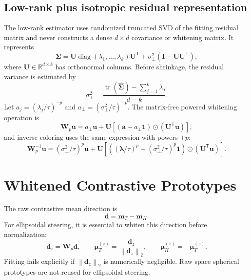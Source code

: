 \documentclass[11pt]{article}
\newcommand{\R}{\mathbb{R}}
\newcommand{\mTz}{\bm{\mu}^{(z)}_{T}}
\newcommand{\mHz}{\bm{\mu}^{(z)}_{H}}
\newcommand{\norm}[1]{\left\lVert #1\right\rVert_2}
\newcommand{\trans}{^{\mathsf T}}
\begin{document}
\subsection{Low-rank plus isotropic residual representation}

The low-rank estimator uses randomized truncated SVD of the fitting residual
matrix and never constructs a dense $d\times d$ covariance or whitening
matrix.  It represents
\begin{equation}
 \bm\Sigma=\bm U\operatorname{diag}(\lambda_1,\ldots,\lambda_k)\bm U\trans
 +\sigma_\perp^2(\bm I-\bm U\bm U\trans),
\end{equation}
where $\bm U\in\R^{d\times k}$ has orthonormal columns.  Before shrinkage, the
residual variance is estimated by
\begin{equation}
  \sigma_\perp^2=
  \frac{\operatorname{tr}(\widehat{\bm\Sigma})-
  \sum_{j=1}^{k}\lambda_j}{d-k}.
\end{equation}
Let $a_j=(\lambda_j/\tau)^{-p}$ and
$a_\perp=(\sigma_\perp^2/\tau)^{-p}$. The matrix-free powered whitening
operation is
\begin{equation}
\bm W_p\bm u = a_\perp\bm u+
\bm U\left[
\left(\bm a-a_\perp\bm 1\right)
\odot(\bm U\trans\bm u)
\right],
\end{equation}
and inverse coloring uses the same expression with powers $+p$:
\begin{equation}
\bm W_p^{-1}\bm u = (\sigma_\perp^2/\tau)^p\bm u+
\bm U\left[
\left((\bm\lambda/\tau)^p-(\sigma_\perp^2/\tau)^p\bm 1\right)
\odot(\bm U\trans\bm u)
\right].
\end{equation}

\section{Whitened Contrastive Prototypes}

The raw contrastive mean direction is
\begin{equation}
  \bm d=\bm m_T-\bm m_H.
\end{equation}
For ellipsoidal steering, it is essential to whiten this direction before
normalization:
\begin{equation}
  \bm d_z=\bm W_p\bm d,
  \qquad
  \mTz=\frac{\bm d_z}{\norm{\bm d_z}},
  \qquad
  \mHz=-\mTz.
\end{equation}
Fitting fails explicitly if $\norm{\bm d_z}$ is numerically negligible.  Raw
space spherical prototypes are not reused for ellipsoidal steering.
\end{document}
